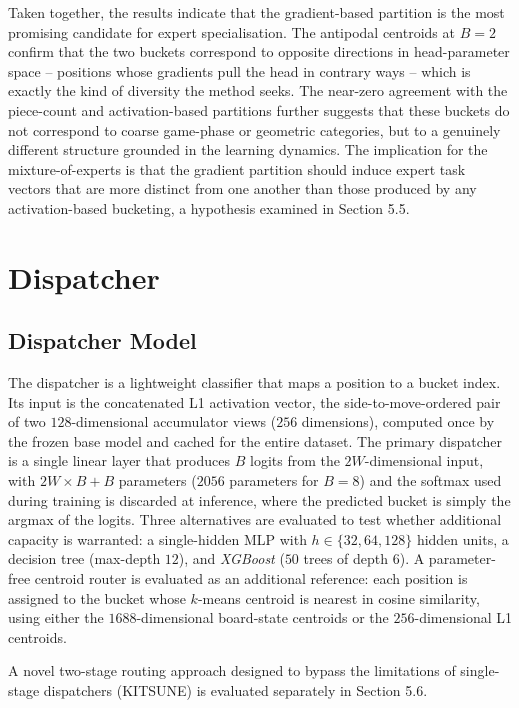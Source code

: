 Taken together, the results indicate that the gradient-based partition is the most promising candidate for expert specialisation. The antipodal centroids at $B=2$ confirm that the two buckets correspond to opposite directions in head-parameter space -- positions whose gradients pull the head in contrary ways -- which is exactly the kind of diversity the method seeks. The near-zero agreement with the piece-count and activation-based partitions further suggests that these buckets do not correspond to coarse game-phase or geometric categories, but to a genuinely different structure grounded in the learning dynamics. The implication for the mixture-of-experts is that the gradient partition should induce expert task vectors that are more distinct from one another than those produced by any activation-based bucketing, a hypothesis examined in Section 5.5.

\section{Dispatcher}

\subsection{Dispatcher Model}

The dispatcher is a lightweight classifier that maps a position to a bucket index. Its input is the concatenated L1 activation vector, the side-to-move-ordered pair of two $128$-dimensional accumulator views ($256$ dimensions), computed once by the frozen base model and cached for the entire dataset. The primary dispatcher is a single linear layer that produces $B$ logits from the $2W$-dimensional input, with $2W \times B + B$ parameters ($2056$ parameters for $B = 8$) and the softmax used during training is discarded at inference, where the predicted bucket is simply the argmax of the logits. Three alternatives are evaluated to test whether additional capacity is warranted: a single-hidden MLP with $h \in \{32, 64, 128\}$ hidden units, a decision tree (max-depth $12$), and \emph{XGBoost} ($50$ trees of depth $6$). A parameter-free centroid router is evaluated as an additional reference: each position is assigned to the bucket whose $k$-means centroid is nearest in cosine similarity, using either the $1688$-dimensional board-state centroids or the $256$-dimensional L1 centroids.

A novel two-stage routing approach designed to bypass the limitations of single-stage dispatchers (KITSUNE) is evaluated separately in Section 5.6.

